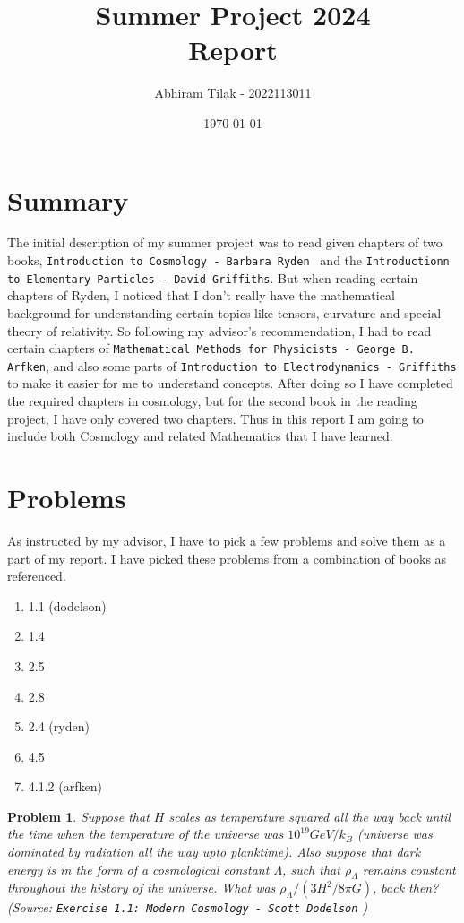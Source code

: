 \documentclass[11pt]{article}
\title{ Summer Project 2024 \\ Report }
\author{ Abhiram Tilak - 2022113011 }
\date{\today}
\newtheorem{problem}{Problem}
\begin{document}
\maketitle

\section{Summary}

The initial description of my summer project was to read given chapters of two
books, \texttt{Introduction to Cosmology - Barbara Ryden } and the
\texttt{Introductionn to Elementary Particles - David Griffiths}. But when
reading certain chapters of Ryden, I noticed that I don't really have the
mathematical background for understanding certain topics like tensors, curvature and
special theory of relativity. So following my advisor's recommendation, I
had to read certain chapters of
\texttt{Mathematical Methods for Physicists - George B. Arfken}, and also some
parts of \texttt{Introduction to Electrodynamics - Griffiths} to make it easier
for me to understand concepts. After doing so
I have completed the required chapters in cosmology, but for the second book
in the reading project, I have only covered two chapters. Thus in this report
I am going to include both Cosmology and related Mathematics that I have
learned.

\section{Problems}

As instructed by my advisor, I have to pick a few problems and solve them
as a part of my report. I have picked these problems from a combination of books
as referenced.

\begin{enumerate}
	\item 1.1 (dodelson)
	\item 1.4
	\item 2.5
	\item 2.8
	\item 2.4 (ryden)
	\item 4.5
	\item 4.1.2 (arfken)
\end{enumerate}

\begin{problem}
	Suppose that $H$ scales as temperature squared all the way back until
	the time when the temperature of the universe was $10^{19} GeV/k_B$
	(universe was dominated by radiation all the way upto planktime). Also
	suppose that dark energy is in the form of a cosmological constant
	$\Lambda$, such that $\rho_\Lambda$ remains constant throughout the
	history of the universe. What was $\rho_\Lambda/(3H^2/8\pi G)$, back
	then? (Source: \texttt{Exercise 1.1: Modern Cosmology - Scott Dodelson} )
\end{problem}
\end{document}
